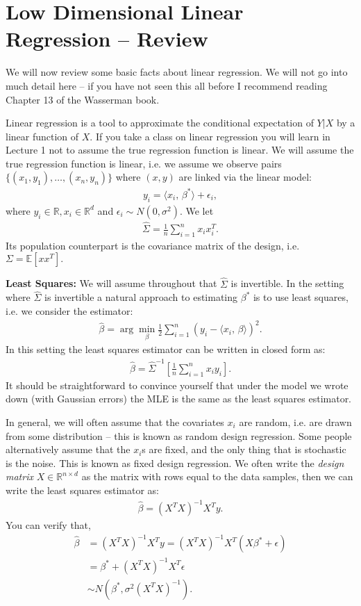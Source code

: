 \documentclass[twoside,12pt]{article}
\newcommand{\inprod}[2]{\ensuremath{\langle #1 , \, #2 \rangle}}
\begin{document}
\section{Low Dimensional Linear Regression -- Review} 
We will now review some basic facts about linear regression. We will not go into much detail here -- if you have not seen this all before I recommend reading Chapter 13 of the Wasserman book. 

Linear regression is a tool to approximate the conditional expectation of $Y|X$ by a linear function of $X$. If you take a class on linear regression you will learn in Lecture 1 not to assume the true regression function is linear. We will assume the true regression function is linear, i.e. we assume we observe pairs $\{(x_1,y_1), \ldots,(x_n,y_n)\}$ where $(x,y)$ are linked via the linear model:
\begin{align*}
y_i = \inprod{x_i}{\beta^*} + \epsilon_i,
\end{align*}
where $y_i \in \mathbb{R}, x_i \in \mathbb{R}^d$ and $\epsilon_i \sim N(0,\sigma^2)$. We let 
\begin{align*}
\widehat{\Sigma} = \frac{1}{n} \sum_{i=1}^n x_i x_i^T. 
\end{align*}
Its population counterpart is the covariance matrix of the design, i.e. $\Sigma = \mathbb{E}[xx^T].$

{\bf Least Squares: } We will assume throughout that $\widehat{\Sigma}$ is invertible. In the setting where $\widehat{\Sigma}$ is invertible a natural approach to estimating $\beta^*$ is to use least squares, i.e. we consider the estimator:
\begin{align*}
\widehat{\beta} = \arg \min_{\beta} \frac{1}{2} \sum_{i=1}^n (y_i - \inprod{x_i}{\beta})^2.
\end{align*}
In this setting the least squares estimator can be written in closed form as:
\begin{align*}
\widehat{\beta} = \widehat{\Sigma}^{-1} \left[ \frac{1}{n} \sum_{i=1}^n x_i y_i\right]. 
\end{align*}
It should be straightforward to convince yourself that under the model we wrote down (with Gaussian errors) the MLE is the same as the least squares estimator.

In general, we will often assume that the covariates $x_i$ are random, i.e. are drawn from some distribution -- this is known as random design regression. Some people alternatively assume that the $x_i$s are fixed, and the only thing that is stochastic is the noise. This is known as fixed design regression. We often write the \emph{design matrix} $X \in \mathbb{R}^{n \times d}$ as the matrix with rows equal to the data samples, then we can write the least squares estimator as:
\begin{align*}
\widehat{\beta} = (X^T X)^{-1} X^T y.
\end{align*}
You can verify that,
\begin{align*}
\widehat{\beta} &= (X^T X)^{-1} X^T y = (X^T X)^{-1} X^T (X \beta^* + \epsilon) \\
&= \beta^* +  (X^T X)^{-1} X^T \epsilon \\
&\sim N(\beta^*, \sigma^2 (X^T X)^{-1}).
\end{align*}
\end{document}
